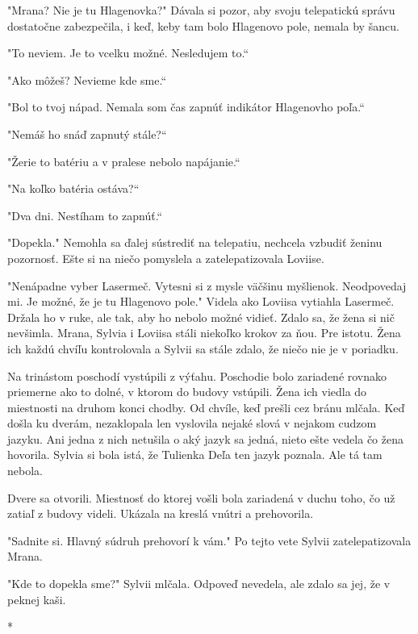 \documentclass{book}
\begin{document}
"$ $Mrana? Nie je tu Hlagenovka?"$ $ Dávala si pozor, aby svoju telepatickú správu dostatočne zabezpečila, i keď, keby tam bolo Hlagenovo pole, nemala by šancu.

"$ $To neviem. Je to vcelku možné. Nesledujem to.“

"$ $Ako môžeš? Nevieme kde sme.“

"$ $Bol to tvoj nápad. Nemala som čas zapnúť indikátor Hlagenovho poľa.“

"$ $Nemáš ho snáď zapnutý stále?“

"$ $Žerie to batériu a v pralese nebolo napájanie.“

"$ $Na koľko batéria ostáva?“

"$ $Dva dni. Nestíham to zapnúť.“

"$ $Dopekla."$ $ Nemohla sa ďalej sústrediť na telepatiu, nechcela vzbudiť ženinu pozornosť. Ešte si na niečo pomyslela a zatelepatizovala Loviise.

"$ $Nenápadne vyber Lasermeč. Vytesni si z mysle väčšinu myšlienok. Neodpovedaj mi. Je možné, že je tu Hlagenovo pole."$ $ Videla ako Loviisa vytiahla Lasermeč. Držala ho v ruke, ale tak, aby ho nebolo možné vidieť. Zdalo sa, že žena si nič nevšimla. Mrana, Sylvia i Loviisa stáli niekoľko krokov za ňou. Pre istotu. Žena ich každú chvíľu kontrolovala a Sylvii sa stále zdalo, že niečo nie je v poriadku.

Na trinástom poschodí vystúpili z výťahu. Poschodie bolo zariadené rovnako priemerne ako to dolné, v ktorom do budovy vstúpili. Žena ich viedla do miestnosti na druhom konci chodby. Od chvíle, keď prešli cez bránu mlčala. Keď došla ku dverám, nezaklopala len vyslovila nejaké slová v nejakom cudzom jazyku. Ani jedna z nich netušila o aký jazyk sa jedná, nieto ešte vedela čo žena hovorila. Sylvia si bola istá, že Tulienka Deľa ten jazyk poznala. Ale tá tam nebola.

Dvere sa otvorili. Miestnosť do ktorej vošli bola zariadená v duchu toho, čo už zatiaľ z budovy videli. Ukázala na kreslá vnútri a prehovorila.

"$ $Sadnite si. Hlavný súdruh prehovorí k vám."$ $ Po tejto vete Sylvii zatelepatizovala Mrana.

"$ $Kde to dopekla sme?"$ $ Sylvii mlčala. Odpoveď nevedela, ale zdalo sa jej, že v peknej kaši.

\begin{center}

*

\end{center}
\end{document}
